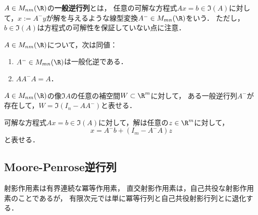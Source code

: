 \documentclass[uplatex, dvipdfmx]{jsreport}
\begin{document}
\begin{definition}
    $A\in M_{nm}(\R)$の\textbf{一般逆行列}とは，
    任意の可解な方程式$Ax=b\in\Im(A)$に対して，$x:=A^{-}y$が解を与えるような線型変換$A^-\in M_{mn}(\R)$をいう．
    ただし，$b\in\Im(A)$は方程式の可解性を保証していない点に注意．
\end{definition}
\begin{proposition}[一般逆行列の特徴付け]
    $A\in M_{nm}(\R)$について，次は同値：
    \begin{enumerate}
        \item $A^-\in M_{mn}(\R)$は一般化逆である．
        \item $AA^-A=A$．
    \end{enumerate}
\end{proposition}

\begin{theorem}[一般逆行列のGram行列は射影を定める]
    $A\in M_{nm}(\R)$の像$\Im A$の任意の補空間$W\subset\R^m$に対して，
    ある一般逆行列$A^-$が存在して，$W=\Im(I_n-AA^-)$と表せる．
\end{theorem}

\begin{theorem}
    可解な方程式$Ax=b\in\Im(A)$に対して，解は任意の$z\in\R^m$に対して，
    \[x=A^-b+(I_m-A^-A)z\]
    と表せる．
\end{theorem}

\subsection{Moore-Penrose逆行列}

\begin{tcolorbox}[colframe=ForestGreen, colback=ForestGreen!10!white,breakable,colbacktitle=ForestGreen!40!white,coltitle=black,fonttitle=\bfseries\sffamily,
    title=]
    射影作用素は有界連続な冪等作用素，
    直交射影作用素は，自己共役な射影作用素のことであるが，
    有限次元では単に冪等行列と自己共役射影行列とに退化する．
\end{tcolorbox}
\end{document}
